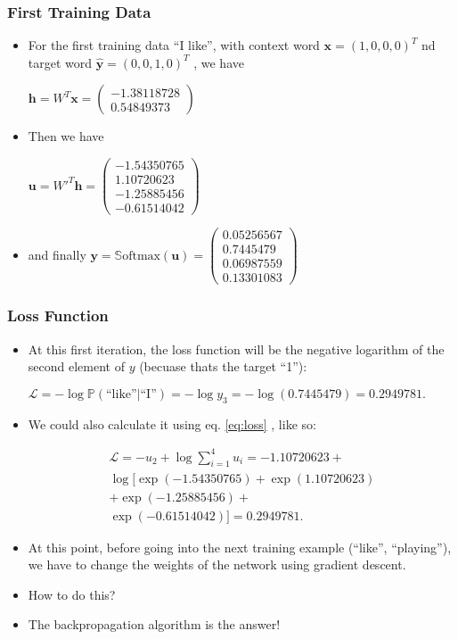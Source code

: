 \begin{frame}[fragile]\frametitle{First Training Data}
  \begin{itemize}
    \item For the first training data “I like”, with context word $\textbf{x}=(1,0,0,0)^T$ nd target word $\hat{\textbf{y}}=(0,0,1,0)^T$  , we have
	
$\textbf{h} = W^T\textbf{x}=
\begin{pmatrix}
	-1.38118728	\\
	0.54849373
\end{pmatrix}
$
\item Then we have

$
\textbf{u} = W'^T\textbf{h}=
\begin{pmatrix}
	-1.54350765  \\
	1.10720623 \\
	-1.25885456 \\
	-0.61514042
\end{pmatrix}
$
\item and finally
$
\textbf{y} = \mathbb{S}\textrm{oftmax}(\textbf{u})=
\begin{pmatrix}
	0.05256567 \\
	 0.7445479  \\
	 0.06987559 \\
	 0.13301083
\end{pmatrix}
$
\end{itemize}

\end{frame}

\begin{frame}[fragile]\frametitle{Loss Function}
  \begin{itemize}
    \item At this first iteration, the loss function will be the negative logarithm of the second element of $y$ (becuase thats the target ``1''):
	
	$\mathcal{L}=-\log\mathbb{P}(\textrm{“like”}|\textrm{“I”})=-\log y_3 = -\log(0.7445479)= 0.2949781.$ 
	\item We could also calculate it using eq. \ref{eq:loss} , like so:
	
\begin{eqnarray*}
\mathcal{L}=-u_2+\log\sum_{i=1}^4 u_i=-1.10720623 + \\
\log[\exp(-1.54350765)+\exp(1.10720623) \\ 
+\exp(-1.25885456)+ \\
\exp(-0.61514042)]=0.2949781.
\end{eqnarray*}
\item At this point, before going into the next training example (“like”, “playing”), we have to change the weights of the network using gradient descent. 
\item How to do this? 
\item The backpropagation algorithm is the answer!
\end{itemize}

\end{frame}

